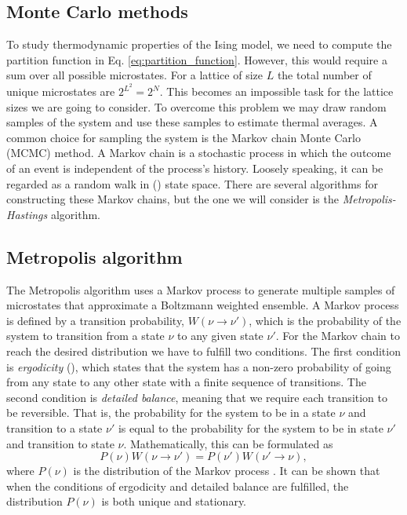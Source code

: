 \subsection{Monte Carlo methods} \label{subsec_theory:MC_methods}

To study thermodynamic properties of the Ising model, we need to compute the partition function in Eq. \eqref{eq:partition_function}. However, this would require a sum over all possible microstates. For a lattice of size $L$ the total number of unique microstates are $2^{L^2}=2^N$. This becomes an impossible task for the lattice sizes we are going to consider. To overcome this problem we may draw random samples of the system and use these samples to estimate thermal averages. A common choice for sampling the system is the Markov chain Monte Carlo (MCMC) method. A Markov chain is a stochastic process in which the outcome of an event is independent of the process's history. Loosely speaking, it can be regarded as a random walk in () state space. There are several algorithms for constructing these Markov chains, but the one we will consider is the \textit{Metropolis-Hastings} algorithm.

\subsection{Metropolis algorithm} \label{subsec_theory:metropolis_algorithm}
The Metropolis algorithm uses a Markov process to generate multiple samples of microstates that approximate a Boltzmann weighted ensemble. A Markov process is defined by a transition probability, $W(\nu \to \nu')$, which is the probability of the system to transition from a state $\nu$ to any given state $\nu'$. For the Markov chain to reach the desired distribution we have to fulfill two conditions.  The first condition is \textit{ergodicity} (), which states that the system has a non-zero probability of going from any state to any other state with a finite sequence of transitions. The second condition is \textit{detailed balance}, meaning that we require each transition to be reversible. That is, the probability for the system to be in a state $\nu$ and transition to a state $\nu'$ is equal to the probability for the system to be in state $\nu'$ and transition to state $\nu$. Mathematically, this can be formulated as 
\begin{equation}
    P(\nu)W(\nu\to \nu') = P(\nu') W(\nu'\to \nu), \label{eq:detailed_balance}
\end{equation} 
where $P(\nu)$ is the distribution of the Markov process . It can be shown that when the conditions of ergodicity and detailed balance are fulfilled, the distribution $P(\nu)$ is both unique and stationary. 

